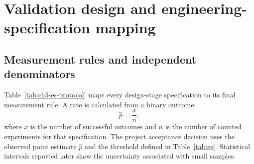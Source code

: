 \section{Validation design and engineering-specification mapping}

\subsection{Measurement rules and independent denominators}

Table~\ref{tab:ch5-es-protocol} maps every design-stage specification to its
final measurement rule. A rate is calculated from a binary outcome:
\begin{equation}
  \widehat p=\frac{x}{n},
  \label{eq:ch5-rate-estimator}
\end{equation}
where \(x\) is the number of successful outcomes and \(n\) is the number of
counted experiments for that specification. The project acceptance decision
uses the observed point estimate \(\widehat p\) and the threshold defined in
Table~\ref{tab:es}. Statistical intervals reported later show the uncertainty
associated with small samples.

